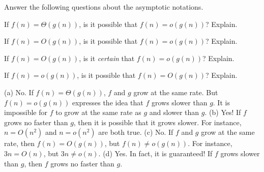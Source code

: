 \begin{ques}
Answer the following questions about the asymptotic notations.
\begin{lenum}
\item
If $f(n)=\Theta(g(n))$, is it possible that $f(n)=o(g(n))$?  Explain.

\noindent
\blanklinetwo
\item
If $f(n)=O(g(n))$, is it possible that $f(n)=o(g(n))$?  Explain.

\noindent
\blanklinetwo
\item
If $f(n)=O(g(n))$, is it {\em certain} that $f(n)=o(g(n))$?  Explain.

\noindent
\blanklinetwo
\item
If $f(n)=o(g(n))$, is it possible that $f(n)=O(g(n))$?  Explain.

\noindent
\blanklinetwo
\end{lenum}
\begin{answer}
(a) No.  If $f(n)=\Theta(g(n))$, $f$ and $g$ grow at the same rate.  But 
$f(n)=o(g(n))$ expresses the idea that $f$ grows slower than $g$.
It is impossible for $f$ to grow at the same rate as $g$ and slower than $g$.
(b) Yes!  If $f$ grows no faster than $g$, then it is possible that it grows slower.
For instance, $n=O(n^2)$ and $n=o(n^2)$ are both true.
(c) No.  If $f$ and $g$ grow at the same rate, then $f(n)=O(g(n))$, but 
$f(n)\neq o(g(n))$. For instance, $3n=O(n)$, but $3n\neq o(n)$. 
(d) Yes.  In fact, it is guaranteed!  If $f$ grows slower than $g$, then
$f$ grows no faster than $g$. 
\end{answer}
\end{ques}



